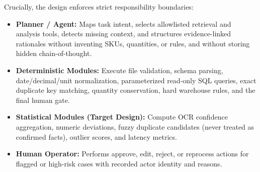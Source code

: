 \documentclass[conference]{IEEEtran}
\begin{document}
Crucially, the design enforces strict responsibility boundaries:
\begin{itemize}
    \item \textbf{Planner / Agent:} Maps task intent, selects allowlisted retrieval and analysis tools, detects missing context, and structures evidence-linked rationales without inventing SKUs, quantities, or rules, and without storing hidden chain-of-thought.
    \item \textbf{Deterministic Modules:} Execute file validation, schema parsing, date/decimal/unit normalization, parameterized read-only SQL queries, exact duplicate key matching, quantity conservation, hard warehouse rules, and the final human gate.
    \item \textbf{Statistical Modules (Target Design):} Compute OCR confidence aggregation, numeric deviations, fuzzy duplicate candidates (never treated as confirmed facts), outlier scores, and latency metrics.
    \item \textbf{Human Operator:} Performs approve, edit, reject, or reprocess actions for flagged or high-risk cases with recorded actor identity and reasons.
\end{itemize}
\end{document}
